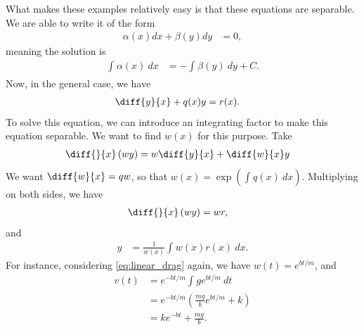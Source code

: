 \documentclass[10pt]{mypackage}
\begin{document}
  What makes these examples relatively easy is that these equations are separable. We are able to write it of the form
  \begin{align*}
    \alpha(x) dx + \beta(y) dy &= 0,
  \end{align*}
  meaning the solution is
  \begin{align*}
    \int_{}^{} \alpha(x)\:dx &= - \int_{}^{} \beta(y)\:dy + C.
  \end{align*}
  Now, in the general case, we have
  \begin{align*}
    \diff{y}{x} + q(x)y &= r(x).
  \end{align*}
  To solve this equation, we can introduce an integrating factor to make this equation separable. We want to find $w(x)$ for this purpose. Take
  \begin{align*}
    \diff{}{x}\left( wy \right) &= w\diff{y}{x} + \diff{w}{x} y
  \end{align*}
  We want $\diff{w}{x} = qw$, so that $w(x) = \exp\left( \int_{}^{} q(x)\:dx \right)$. Multiplying on both sides, we have
  \begin{align*}
    \diff{}{x}\left( wy \right) &= wr,
  \end{align*}
  and
  \begin{align*}
    y &= \frac{1}{w(x)} \int_{}^{} w(x)r(x)\:dx.
  \end{align*}
  For instance, considering \eqref{eq:linear_drag} again, we have $w(t) = e^{bt/m}$, and
  \begin{align*}
    v(t) &= e^{-bt/m} \int_{}^{} ge^{bt/m}\:dt\\
         &= e^{-bt/m} \left( \frac{mg}{b}e^{bt/m} + k \right)\\
         &=ke^{-bt} + \frac{mg}{b}.
  \end{align*}
\end{document}
